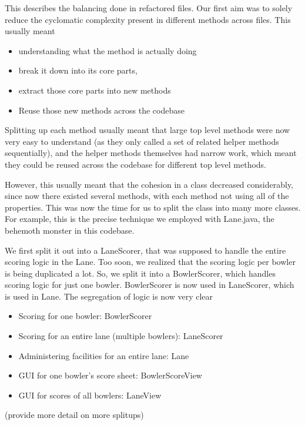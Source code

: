 This describes the balancing done in refactored files. Our first aim was to solely reduce the cyclomatic complexity present in different methods across files. This usually meant

\begin{itemize}
    \item understanding what the method is actually doing
    \item break it down into its core parts,
    \item extract those core parts into new methods
    \item Reuse those new methods across the codebase
\end{itemize}

Splitting up each method usually meant that large top level methods were now very easy to understand (as they only called a set of related helper methods sequentially), and the helper methods themselves had narrow work, which meant they could be reused across the codebase for different top level methods.

However, this usually meant that the cohesion in a class decreased considerably, since now there existed several methods, with each method not using all of the properties. This was now the time for us to split the class into many more classes. For example, this is the precise technique we employed with Lane.java, the behemoth monster in this codebase.

We first split it out into a LaneScorer, that was supposed to handle the entire scoring logic in the Lane. Too soon, we realized that the scoring logic per bowler is being duplicated a lot. So, we split it into a BowlerScorer, which handles scoring logic for just one bowler. BowlerScorer is now used in LaneScorer, which is used in Lane. The segregation of logic is now very clear

\begin{itemize}
    \item Scoring for one bowler: BowlerScorer
    \item Scoring for an entire lane (multiple bowlers): LaneScorer
    \item Administering facilities for an entire lane: Lane
    \item GUI for one bowler's score sheet: BowlerScoreView
    \item GUI for scores of all bowlers: LaneView
\end{itemize}

(provide more detail on more splitups)

